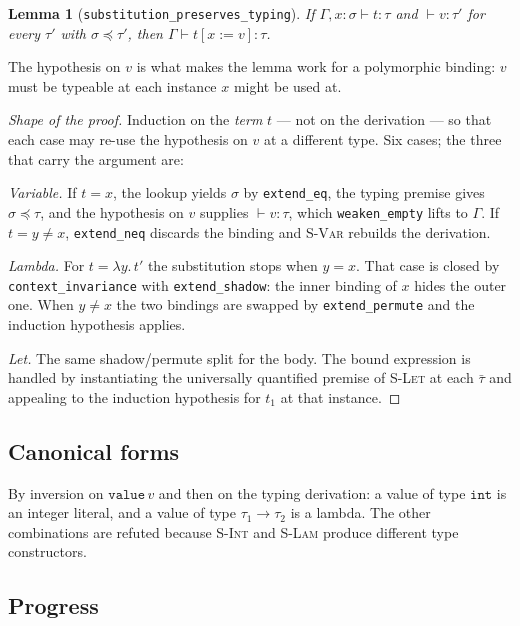 \documentclass[11pt,a4paper]{article}
\newtheorem{lemma}[theorem]{Lemma}
\newcommand{\tint}{\mathtt{int}}
\newcommand{\inst}{\preceq}
\newcommand{\subst}[3]{#1[#2 := #3]}
\begin{document}
\begin{lemma}[\texttt{substitution\_preserves\_typing}]
  If $\Gamma, x{:}\sigma \vdash t : \tau$ and $\vdash v : \tau'$ for
  \emph{every} $\tau'$ with $\sigma \inst \tau'$, then
  $\Gamma \vdash \subst{t}{x}{v} : \tau$.
\end{lemma}

The hypothesis on $v$ is what makes the lemma work for a polymorphic binding:
$v$ must be typeable at each instance $x$ might be used at.

\begin{proof}[Shape of the proof]
Induction on the \emph{term} $t$ --- not on the derivation --- so that each
case may re-use the hypothesis on $v$ at a different type.  Six cases; the
three that carry the argument are:

\emph{Variable.}  If $t = x$, the lookup yields $\sigma$ by
\texttt{extend\_eq}, the typing premise gives $\sigma \inst \tau$, and the
hypothesis on $v$ supplies $\vdash v : \tau$, which \texttt{weaken\_empty}
lifts to $\Gamma$.  If $t = y \neq x$, \texttt{extend\_neq} discards the
binding and \textsc{S-Var} rebuilds the derivation.

\emph{Lambda.}  For $t = \lambda y.\,t'$ the substitution stops when $y = x$.
That case is closed by \texttt{context\_invariance} with
\texttt{extend\_shadow}: the inner binding of $x$ hides the outer one.  When
$y \neq x$ the two bindings are swapped by \texttt{extend\_permute} and the
induction hypothesis applies.

\emph{Let.}  The same shadow/permute split for the body.  The bound expression
is handled by instantiating the universally quantified premise of
\textsc{S-Let} at each $\bar\tau$ and appealing to the induction hypothesis
for $t_1$ at that instance.
\end{proof}

\subsection{Canonical forms}

By inversion on $\mathtt{value}\,v$ and then on the typing derivation: a value
of type $\tint$ is an integer literal, and a value of type
$\tau_1 \to \tau_2$ is a lambda.  The other combinations are refuted because
\textsc{S-Int} and \textsc{S-Lam} produce different type constructors.

\subsection{Progress}
\end{document}
